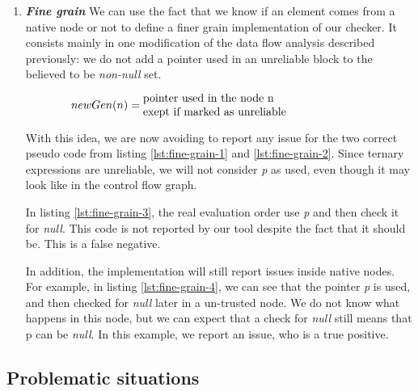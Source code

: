 \begin{enumerate}
\item \textbf{\textit{Fine grain}} \newline
We can use the fact that we know if an element comes from a native node or not to define a finer grain implementation of our checker. 
It consists mainly in one modification of the data flow analysis described previously: we do not add a pointer used in an unreliable block to the believed to be \emph{non-null} set.

\begin{equation}\label{eqn:new_dataflow4}
newGen(n) = \parbox{7cm}{pointer used in the node n\newline exept if marked as unreliable}
\end{equation}





With this idea, we are now avoiding to report any issue for the two correct pseudo code from listing \ref{lst:fine-grain-1} and \ref{lst:fine-grain-2}. Since ternary expressions are unreliable, we will not consider \emph{p} as used, even though it may look like in the control flow graph.



In listing \ref{lst:fine-grain-3}, the real evaluation order use \emph{p} and then check it for \emph{null}. 
This code is not reported by our tool despite the fact that it should be. This is a false negative.\newline



In addition, the implementation will still report issues inside native nodes.
For example, in listing \ref{lst:fine-grain-4}, we can see that the pointer \emph{p} is used, and then checked for \emph{null} later in a un-trusted node. 
We do not know what happens in this node, but we can expect that a check for \emph{null} still means that p can be \emph{null}. 
In this example, we report an issue, who is a true positive.
\end{enumerate}

\subsection{Problematic situations}
\label{subsec:other_problematic_situation}
	
